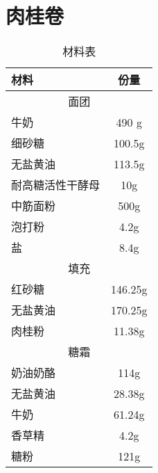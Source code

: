 \section{肉桂卷}

\begin{table}[h]
    \centering
    \begin{tabular}{|l||c|}\hline
     \textbf{材料}    &  \textbf{份量}\\ \hline\hline
    \multicolumn{2}{|c|}{面团}\\ \hline
    牛奶     &  490 g \\ \hline
    细砂糖     &  100.5g \\ \hline
    无盐黄油     &  113.5g \\ \hline
    耐高糖活性干酵母  & 10g  \\ \hline
    中筋面粉 &  500g  \\ \hline
    泡打粉     &  4.2g \\ \hline
    盐     & 8.4g  \\ \hline
    \multicolumn{2}{|c|}{填充}\\ \hline
    红砂糖     &  146.25g \\ \hline
    无盐黄油     &  170.25g \\ \hline
    肉桂粉     &  11.38g \\ \hline
    \multicolumn{2}{|c|}{糖霜}\\ \hline
    奶油奶酪     &  114g \\ \hline
    无盐黄油     &  28.38g \\ \hline
    牛奶     &  61.24g\\ \hline
    香草精     &  4.2g\\ \hline
    糖粉     &  121g \\ \hline
    \end{tabular}
    \caption{材料表}
\end{table}

